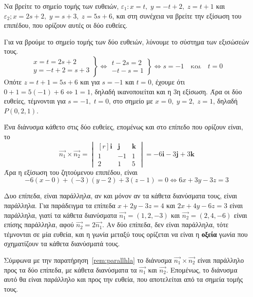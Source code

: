 \begin{example}
  Να βρείτε το σημείο τομής των ευθειών, $ \varepsilon _{1}: x=t, \; y=-t+2, \;
  z=t+1$ και $ \varepsilon _{2}; x=2s+2, \; y=s+3, \; z=5s+6 $, και στη συνέχεια να 
  βρείτε την εξίσωση του επιπέδου, που ορίζουν αυτές οι δύο ευθείες.
\end{example}
\begin{solution}
  Για να βρούμε το σημείο τομής των δύο ευθειών, λύνουμε το σύστημα των εξισώσεών τους.
  \[
    \left.
      \begin{matrix}
        x=t=2s+2 \\
        y=-t+2=s+3
      \end{matrix} 
    \right\} \Leftrightarrow 
    \left.
      \begin{matrix}
        t-2s=2 \\
        -t-s=1
      \end{matrix} 
    \right\} \Leftrightarrow s=-1 \quad \text{και} \quad t=0
  \] 
  Οπότε $ z=t+1=5s+6 $ και για $ s=-1 $ και $ t=0 $, έχουμε ότι $ 0+1=5(-1)+6
  \Leftrightarrow 1 = 1 $, δηλαδή ικανοποιείται και η 3η εξίσωση. Άρα οι δύο 
  ευθείες, τέμνονται για $ s=-1, \; t=0 $, στο σημείο με $ x=0, \; y=2, \; z=1 $, 
  δηλαδή $ P(0,2,1) $.

  Ένα διάνυσμα κάθετο στις δύο ευθείες, επομένως και στο επίπεδο που ορίζουν είναι, το
  \[
    \vec{n_{1}} \times \vec{n_{2}} = 
    \begin{vmatrix*}[r]
      \mathbf{i} & \mathbf{j} & \mathbf{k} \\
      1 & -1 & 1 \\
      2 & 1 & 5 
    \end{vmatrix*} = -6 \mathbf{i}-3 \mathbf{j}+3 \mathbf{k}
  \]  
  Άρα η εξίσωση του ζητούμενου επιπέδου, είναι 
  \[
    -6(x-0)+(-3)(y-2)+3(z-1)=0 \Leftrightarrow 6x+3y-3z=3 
  \]
\end{solution}

\begin{rem}\label{rem:parallhla}
  Δυο επίπεδα, είναι \textcolor{Col1}{παράλληλα}, αν και μόνον αν τα κάθετα διανύσματα 
  τους, είναι παράλληλα. Για παράδειγμα τα επίπεδα $ x+2y-3z=4 $ και $ 2x+4y-6z=3 $ 
  είναι παράλληλα, γιατί τα κάθετα διανύσματα $ \vec{n_{1}} = (1,2,-3) $ και 
  $ \vec{n_{2}} = (2,4,-6) $ είναι επίσης παράλληλα, αφού 
  $ \vec{n_{2}} = 2 \vec{n_{1}} $. Αν δύο επίπεδα, δεν είναι παράλληλα, τότε τέμνονται 
  σε μία ευθεία, και η \textcolor{Col1}{γωνία} μεταξύ τους ορίζεται να είναι η 
  \textbf{οξεία} γωνία που σχηματίζουν τα κάθετα διανύσματά τους.
\end{rem}
\begin{rem}
  Σύμφωνα με την παρατήρηση~\ref{rem:parallhla} το διάνυσμα 
  $ \vec{n_{1}} \times \vec{n_{2}} $ είναι παράλληλο προς τα δύο επίπεδα, με κάθετα 
  διανύσματα τα $ \vec{n_{1}} $ και $ \vec{n_{2}} $. Επομένως, το διάνυσμα αυτό 
  θα είναι παράλληλο και προς την ευθεία, που αποτελείται από τα σημεία τομής τους.
\end{rem}


